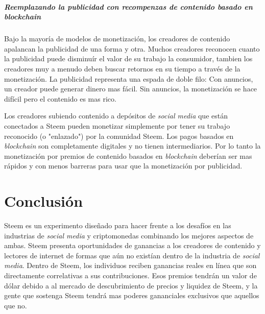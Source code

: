 \documentclass[a4paper,titlepage,final]{article}
\begin{document}
\subparagraph{Reemplazando la publicidad con recompenzas de contenido basado en \textit{blockchain}}

Bajo la mayoría de modelos de monetización, los creadores de contenido apalancan la publicidad de una forma y otra. Muchos creadores reconocen cuanto la publicidad puede disminuír el valor de su trabajo la consumidor, tambien los creadores muy a menudo deben buscar retornos en su tiempo a través de la monetización. La publicidad representa una espada de doble filo: Con anuncios, un creador puede generar dinero mas fácil. Sin anuncios, la monetización se hace difícil pero el contenido es mas rico.

Los creadores subiendo contenido a depósitos de \textit{social media} que están conectados a Steem pueden monetizar simplemente por tener su trabajo reconocido (o "enlazado") por la comunidad Steem. Los pagos basados en \textit{blockchain} son completamente digitales y no tienen intermediarios. Por lo tanto la monetización por premios de contenido basados en \textit{blockchain} deberían ser mas rápidos y con menos barreras para usar que la monetización por publicidad.

\section{Conclusión}

Steem es un experimento diseñado para hacer frente a los desafíos en las industrias de \textit{social media} y criptomonedas combinando los mejores aspectos de ambas. Steem presenta oportunidades de ganancias a los creadores de contenido y lectores de internet de formas que aún no existían dentro de la industria de \textit{social media}. Dentro de Steem, los individuos reciben ganancias reales en línea que son directamente correlativas a sus contribuciones. Esos premios tendrán un valor de dólar debido a al mercado de descubrimiento de precios y liquidez de Steem, y la gente que sostenga Steem tendrá mas poderes gananciales exclusivos que aquellos que no.

\newpage

\end{document}
